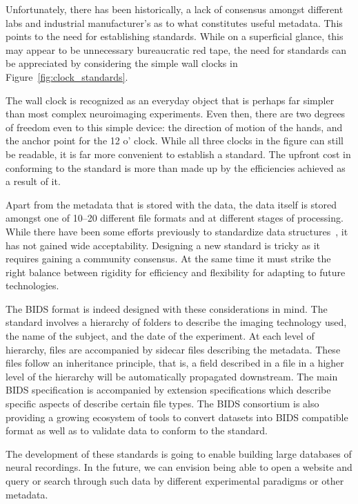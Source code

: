 Unfortunately, there has been historically, a lack of consensus amongst different labs and industrial manufacturer's as to what constitutes useful metadata. This points to the need for establishing standards. While on a superficial glance, this may appear to be unnecessary bureaucratic red tape, the need for standards can be appreciated by considering the simple wall clocks in Figure~\ref{fig:clock_standards}.

The wall clock is recognized as an everyday object that is perhaps far simpler than most complex neuroimaging experiments. Even then, there are two degrees of freedom even to this simple device: the direction of motion of the hands, and the anchor point for the 12 o' clock. While all three clocks in the figure can still be readable, it is far more convenient to establish a standard. The upfront cost in conforming to the standard is more than made up by the efficiencies achieved as a result of it.

Apart from the metadata that is stored with the data, the data itself is stored amongst one of 10--20 different file formats and at different stages of processing. While there have been some efforts previously to standardize data structures~\citep{gibson2009minimum, grewe2011bottom, stoewer2013singlefile, teeters2015neurodata, bigdely2016preparing}, it has not gained wide acceptability. Designing a new standard is tricky as it requires gaining a community consensus. At the same time it must strike the right balance between rigidity for efficiency and flexibility for adapting to future technologies. 

The BIDS format is indeed designed with these considerations in mind. The standard involves a hierarchy of folders to describe the imaging technology used, the name of the subject, and the date of the experiment. At each level of hierarchy, files are accompanied by sidecar  files describing the metadata. These files follow an inheritance principle, that is, a field described in a  file in a higher level of the hierarchy will be automatically propagated downstream. The main BIDS specification is accompanied by extension specifications which describe specific aspects of describe certain file types. The BIDS consortium is also providing a growing ecosystem of tools to convert datasets into BIDS compatible format as well as to validate data to conform to the standard. 

The development of these standards is going to enable building large databases of neural recordings. In the future, we can envision being able to open a website and query or search through such data by different experimental paradigms or other metadata.

